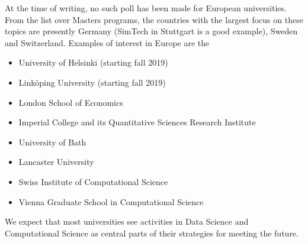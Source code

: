 \documentclass[a4paper,10pt]{article}
\begin{document}
At the time of writing, no such poll has been made for European universities. From the list over Masters programs, the countries with the largest focus on these topics are presently Germany (SimTech in Stuttgart is a good example), Sweden and Switzerland. Examples of interest in Europe are the
\begin{itemize}
\item University of Helsinki (starting fall 2019)
\item Link\"oping University (starting fall 2019)
\item London School of Economics
\item Imperial College and its Quantitative Sciences Research Institute
\item University of Bath
\item Lancaster University
\item Swiss Institute of Computational Science
\item Vienna Graduate School in Computational Science
\end{itemize}
We expect that most universities see activities in Data Science and Computational Science as central parts of their strategies for meeting the future.  
\end{document}
